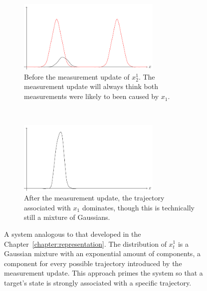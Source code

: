 \begin{figure}[!ht]
    \centering
    \begin{subfigure}[t]{0.5\textwidth}
        \centering
        \includegraphics[height=3.5cm]{tikz/measurement_product}
        \caption{Before the measurement update of $x_2^1$. The measurement update will always think both measurements were likely to been caused by $x_1$.}
    \end{subfigure}%
   ~
    \centering
    \begin{subfigure}[t]{0.5\textwidth}
        \centering
        \includegraphics[height=3.5cm]{tikz/second_mixture_product}
        \caption{After the measurement update, the trajectory associated with $x_1$ dominates, though this is technically still a mixture of Gaussians. }
    \end{subfigure}%
    \caption{A system analogous to that developed in the Chapter~\ref{chapter:representation}. The distribution of $x_{t}^{1}$ is a Gaussian mixture with an exponential amount of components, a component for every possible trajectory introduced by the measurement update. This approach primes the system so that a target's state is strongly associated with a specific trajectory. }
    \label{figure:identity_resolved}
\end{figure}

